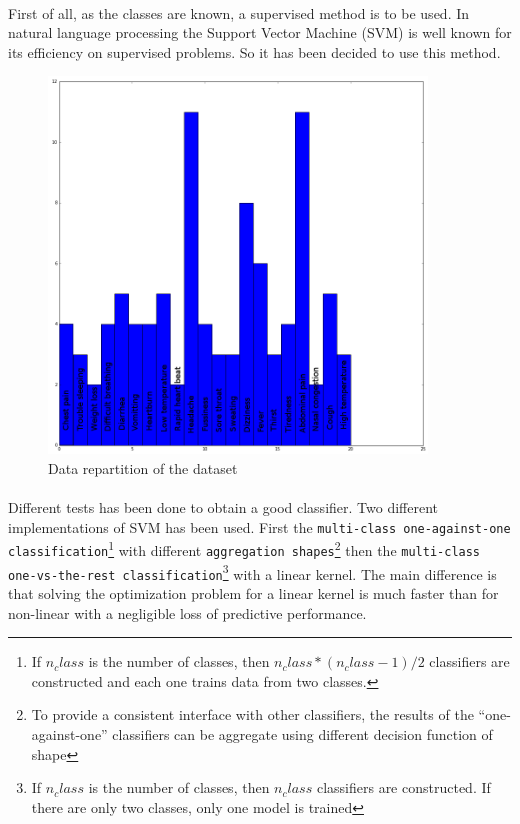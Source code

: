 \paragraph{}
First of all, as the classes are known, a supervised method is to be used. In natural language processing the Support Vector Machine (SVM)\cite{bib:misc:6} is well known for its efficiency on supervised problems. So it has been decided to use this method. 

\begin{figure}[H]
	\centering
	\includegraphics[height=10cm]{classifier_classes_repartition}
	\caption{Data repartition of the dataset}
	\label{dataset}
\end{figure}

\paragraph{}
Different tests has been done to obtain a good classifier. Two different implementations of SVM has been used. First the \texttt{multi-class one-against-one classification}\footnote{If $n_class$ is the number of classes, then $n_class * (n_class - 1) / 2$ classifiers are constructed and each one trains data from two classes.} with different \texttt{aggregation shapes}\footnote{To provide a consistent interface with other classifiers, the results of the “one-against-one” classifiers can be aggregate using different decision function of shape} then the \texttt{multi-class one-vs-the-rest classification}\footnote{If $n_class$ is the number of classes, then $n_class$ classifiers are constructed. If there are only two classes, only one model is trained} with a linear kernel\cite{bib:misc:5}. The main difference is that solving the optimization problem for a linear kernel is much faster than for non-linear with a negligible loss of predictive performance\cite{bib:article:1}.

